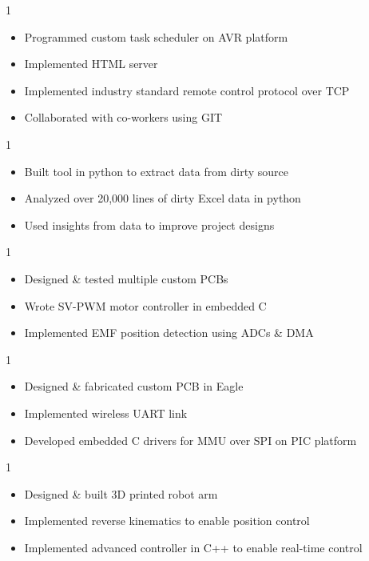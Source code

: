 \documentclass[10pt, letterpaper, ragged2e, withhyper]{AltaCV/altacv}
\def\RSEAMP{1}		%
\def\RSDATA{0}		%
\def\CSMBLDC{1}		%
\def\CSMQUAD{0}		%
\def\LSROBO{0}		%
\begin{document}
\begin{paracol}{2}
\if\RSEAMP1
\divider
{}
\begin{itemize}
\item Programmed custom task scheduler on AVR platform
\item Implemented HTML server
\item Implemented industry standard remote control protocol over TCP
\item Collaborated with co-workers using GIT
\end{itemize}
\fi

\if\RSDATA1

\divider

\begin{itemize}
\item Built tool in python to extract data from dirty source
\item Analyzed over 20,000 lines of dirty Excel data in python
\item Used insights from data to improve project designs
\end{itemize}
\fi

\if\CSMBLDC1
\divider
{}
\begin{itemize}
\item Designed \& tested multiple custom PCBs
\item Wrote SV-PWM motor controller in embedded C
\item Implemented EMF position detection using ADCs \& DMA 
\end{itemize}
\fi

\if\CSMQUAD1
\divider
{}
\begin{itemize}
\item Designed \& fabricated custom PCB in Eagle
\item Implemented wireless UART link
\item Developed embedded C drivers for MMU over SPI on PIC platform
\end{itemize}
\fi


\if\LSROBO1
\divider

\begin{itemize}
\item Designed \& built 3D printed robot arm
\item Implemented reverse kinematics to enable position control
\item Implemented advanced controller in C++ to enable real-time control
\end{itemize}
\fi



\end{paracol}
\end{document}
